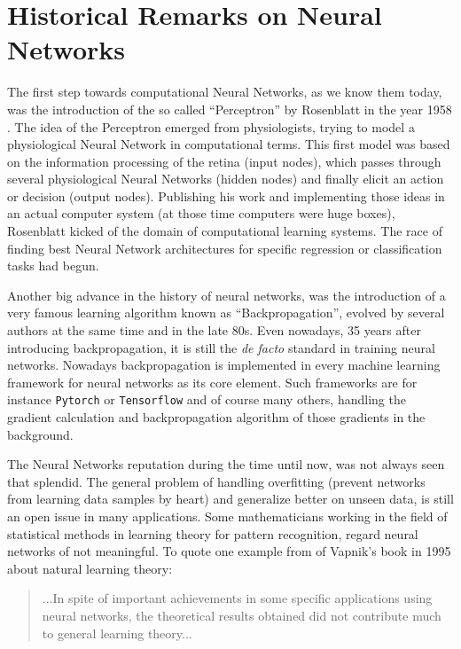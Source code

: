 
\section{Historical Remarks on Neural Networks}\label{sec:prev_nn_history}
The first step towards computational Neural Networks, as we know them today, was the introduction of the so called \enquote{Perceptron} by Rosenblatt in the year 1958 \cite{Rosenblatt1958}. 
The idea of the Perceptron emerged from physiologists, trying to model a physiological Neural Network in computational terms. 
This first model was based on the information processing of the retina (input nodes), which passes through several physiological Neural Networks (hidden nodes) and finally elicit an action or decision (output nodes).
Publishing his work and implementing those ideas in an actual computer system (at those time computers were huge boxes), Rosenblatt kicked of the domain of computational learning systems.
The race of finding best Neural Network architectures for specific regression or classification tasks had begun.

Another big advance in the history of neural networks, was the introduction of a very famous learning algorithm known as \enquote{Backpropagation}, evolved by several authors at the same time \cite{LeCun1986} and \cite{Rumelhart1986} in the late 80s. 
Even nowadays, 35 years after introducing backpropagation, it is still the \emph{de facto} standard in training neural networks.
Nowadays backpropagation is implemented in every machine learning framework for neural networks as its core element.
Such frameworks are for instance \texttt{Pytorch} or \texttt{Tensorflow} and of course many others, handling the gradient calculation and backpropagation algorithm of those gradients in the background.

The Neural Networks reputation during the time until now, was not always seen that splendid.
The general problem of handling overfitting (prevent networks from learning data samples by heart) and generalize better on unseen data, is still an open issue in many applications.
Some mathematicians working in the field of statistical methods in learning theory for pattern recognition, regard neural networks of not meaningful.
To quote one example from \cite{Vapnik1995} of Vapnik's book in 1995 about natural learning theory:

\begin{quote}
...In spite of important achievements in some specific applications using neural networks, the theoretical results obtained did not contribute much to general learning theory...
\end{quote}

